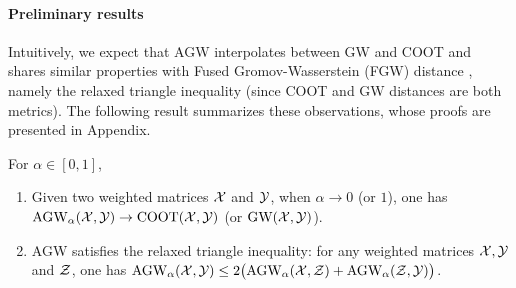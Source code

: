 \paragraph{Preliminary results}
Intuitively, we expect that AGW interpolates between GW and COOT and shares similar properties
with Fused Gromov-Wasserstein (FGW) distance \citep{Vayer19b}, namely
the relaxed triangle inequality (since COOT and GW distances are both metrics).
The following result summarizes these observations, whose proofs are presented in
Appendix.
\begin{proposition}
\label{prop:basic_prop}
For $\alpha \in [0, 1]$,
\begin{enumerate}
    \item Given two weighted matrices $\mathcal X$ and $\mathcal Y$, when $\alpha \to 0$ (or $1$),
    one has $\text{AGW}_{\alpha}(\mathcal X, \mathcal Y) \to \text{COOT}(\mathcal X, \mathcal Y)$ (or $\text{GW}(\mathcal X, \mathcal Y)$).

    \item AGW satisfies the relaxed triangle inequality: for any weighted matrices $\mathcal X, \mathcal Y$
    and $\mathcal Z$, one has $\text{AGW}_{\alpha}(\mathcal X, \mathcal Y) \leq 2 \big( \text{AGW}_{\alpha}(\mathcal X, \mathcal Z)
    + \text{AGW}_{\alpha}(\mathcal Z,  \mathcal Y) \big)$.
\end{enumerate}
\end{proposition}

